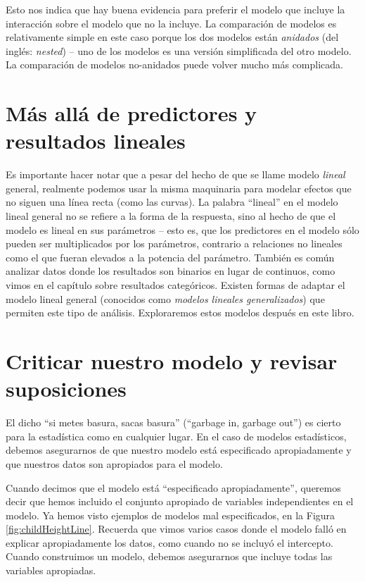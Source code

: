 \documentclass[
  12pt,
]{book}
\begin{document}
Esto nos indica que hay buena evidencia para preferir el modelo que incluye la interacción sobre el modelo que no la incluye. La comparación de modelos es relativamente simple en este caso porque los dos modelos están \emph{anidados} (del inglés: \emph{nested}) -- uno de los modelos es una versión simplificada del otro modelo. La comparación de modelos no-anidados puede volver mucho más complicada.

\hypertarget{muxe1s-alluxe1-de-predictores-y-resultados-lineales}{%
\section{Más allá de predictores y resultados lineales}\label{muxe1s-alluxe1-de-predictores-y-resultados-lineales}}

Es importante hacer notar que a pesar del hecho de que se llame modelo \emph{lineal} general, realmente podemos usar la misma maquinaria para modelar efectos que no siguen una línea recta (como las curvas). La palabra ``lineal'' en el modelo lineal general no se refiere a la forma de la respuesta, sino al hecho de que el modelo es lineal en sus parámetros -- esto es, que los predictores en el modelo sólo pueden ser multiplicados por los parámetros, contrario a relaciones no lineales como el que fueran elevados a la potencia del parámetro. También es común analizar datos donde los resultados son binarios en lugar de continuos, como vimos en el capítulo sobre resultados categóricos. Existen formas de adaptar el modelo lineal general (conocidos como \emph{modelos lineales generalizados}) que permiten este tipo de análisis. Exploraremos estos modelos después en este libro.

\hypertarget{model-criticism}{%
\section{Criticar nuestro modelo y revisar suposiciones}\label{model-criticism}}

El dicho ``si metes basura, sacas basura'' (``garbage in, garbage out'') es cierto para la estadística como en cualquier lugar. En el caso de modelos estadísticos, debemos asegurarnos de que nuestro modelo está especificado apropiadamente y que nuestros datos son apropiados para el modelo.

Cuando decimos que el modelo está ``especificado apropiadamente'', queremos decir que hemos incluido el conjunto apropiado de variables independientes en el modelo. Ya hemos visto ejemplos de modelos mal especificados, en la Figura \ref{fig:childHeightLine}. Recuerda que vimos varios casos donde el modelo falló en explicar apropiadamente los datos, como cuando no se incluyó el intercepto. Cuando construimos un modelo, debemos asegurarnos que incluye todas las variables apropiadas.
\end{document}
